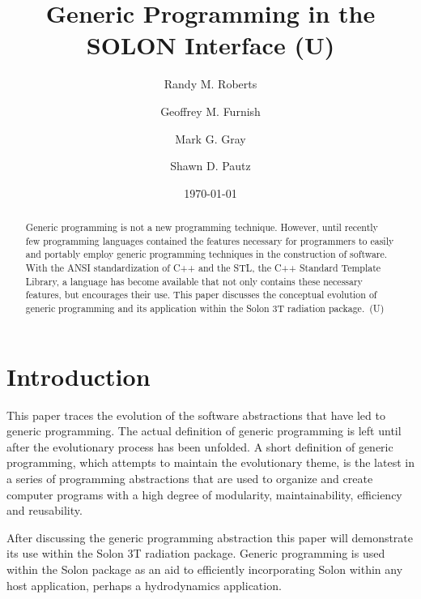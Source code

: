 \documentclass[reqno]{lanl}
\newenvironment{rmrkeywords}{%
  \setlength{\parindent}{2\parindent}
  {\bfseries Keywords:}}
  {\setlength{\parindent}{.5\parindent}}
\begin{document}
\title{Generic Programming in the SOLON Interface (U)}
\author{Randy M. Roberts}
\author{Geoffrey M. Furnish}
\author{Mark G. Gray}
\author{Shawn D. Pautz}
\address{X--TM, MS D409, Los Alamos National Laboratory, Los Alamos, NM
  87544}

\date{\today}


\maketitle

\begin{abstract}
Generic programming is not a new programming technique.
However,
until recently few programming languages contained the features necessary
for programmers to easily
and portably employ generic programming techniques 
in the construction of software.
With the ANSI standardization of C++ and the STL, the C++ Standard Template
Library, a language has become available that not only
contains these necessary features, but encourages their use.
This paper discusses the conceptual evolution of generic programming and
its application within the Solon 3T radiation package.~(U)
\end{abstract}


\section{Introduction}

This paper traces the evolution of the software abstractions that have
led to generic programming.
The actual definition of generic programming is left until after the 
evolutionary process has been unfolded.
A short definition of generic programming, which attempts to maintain the
evolutionary theme, is the latest in a series of programming abstractions
that are used to organize and create computer programs with a high degree
of modularity, maintainability, efficiency and reusability.

After discussing the generic programming abstraction this paper will
demonstrate its use within the Solon 3T radiation package.
Generic programming is used within the Solon package as an aid to efficiently
incorporating Solon within any host application, perhaps a hydrodynamics
application.
\end{document}
